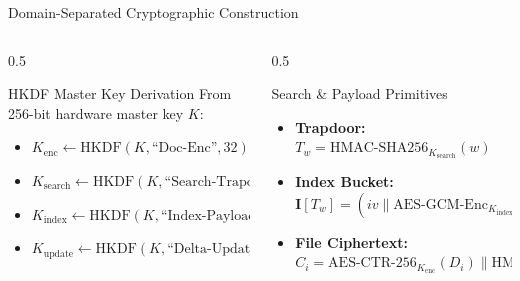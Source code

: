\documentclass[aspectratio=169]{beamer}
\begin{document}
\begin{frame}{Domain-Separated Cryptographic Construction}
  \begin{columns}
    \begin{column}{0.5\textwidth}
      \begin{block}{HKDF Master Key Derivation}
        From 256-bit hardware master key $K$:
        \begin{itemize}
          \item $K_{\text{enc}} \leftarrow \text{HKDF}(K, \text{``Doc-Enc''}, 32)$
          \item $K_{\text{search}} \leftarrow \text{HKDF}(K, \text{``Search-Trapdoor''}, 32)$
          \item $K_{\text{index}} \leftarrow \text{HKDF}(K, \text{``Index-Payload''}, 32)$
          \item $K_{\text{update}} \leftarrow \text{HKDF}(K, \text{``Delta-Update''}, 32)$
        \end{itemize}
      \end{block}
    \end{column}
    \begin{column}{0.5\textwidth}
      \begin{block}{Search \& Payload Primitives}
        \begin{itemize}
          \item \textbf{Trapdoor:} $T_w = \text{HMAC-SHA256}_{K_{\text{search}}}(w)$
          \item \textbf{Index Bucket:} $\mathbf{I}[T_w] = (iv \parallel \text{AES-GCM-Enc}_{K_{\text{index}}}(iv, L_w^*))$
          \item \textbf{File Ciphertext:} $C_i = \text{AES-CTR-256}_{K_{\text{enc}}}(D_i) \parallel \text{HMAC}(C_i)$
        \end{itemize}
      \end{block}
    \end{column}
  \end{columns}
\end{frame}
\end{document}
